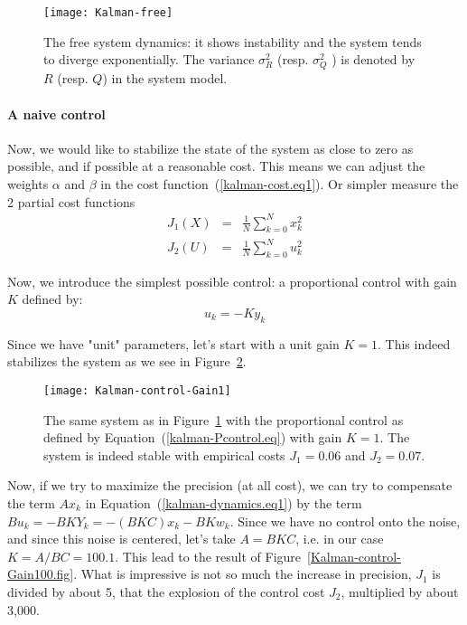 \begin{figure}[htb]
	\centering
	\texttt{[image: Kalman-free]}       
	\caption{The free system dynamics: it shows instability and the system tends to diverge exponentially. The variance $\sigma_R^2$ (resp. $\sigma_Q^2$ ) is denoted by $R$ (resp. $Q$) in the system model.}
	\label{Kalman-free.fig}
\end{figure}

\paragraph{A naive control}
Now, we would like to stabilize the state of the system as close to zero as possible, and if possible at a reasonable cost. This means we can adjust the weights $\alpha$ and $\beta$ in the cost function~(\ref{kalman-cost.eq1}). Or simpler measure the 2 partial cost functions
\begin{eqnarray}
\label{kalman-costX.eq}
J_1(X) &=& \frac{1}{N}\sum_{k=0}^N  x_k^2\\
\label{kalman-costU.eq}
J_2(U) &=& \frac{1}{N}\sum_{k=0}^N u_k^2
\end{eqnarray}

Now, we introduce the simplest possible control: a proportional control with gain $K$ defined by:
\begin{equation}
\label{kalman-Pcontrol.eq}
	u_k = -K y_k
\end{equation}

Since we have "unit" parameters, let's start with a unit gain $K=1$. This indeed stabilizes the system as we see in Figure~\ref{Kalman-control-Gain1.fig}.

\begin{figure}[htb]
	\centering
	\texttt{[image: Kalman-control-Gain1]}       
	\caption{The same system as in Figure~\ref{Kalman-free.fig} with the proportional control as defined by Equation~(\ref{kalman-Pcontrol.eq}) with gain $K=1$. The system is indeed stable with empirical costs $J_1=0.06$ and  $J_2=0.07$.}
	\label{Kalman-control-Gain1.fig}
\end{figure}

Now, if we try to maximize the precision (at all cost), we can try to compensate the term $A x_k$ in Equation~(\ref{kalman-dynamics.eq1}) by the term $B u_k = -BK Y_k = -(BKC) x_k -BK w_k$. Since we have no control onto the noise, and since this noise is centered, let's take $A = BKC$, i.e. in our case $K = A/BC = 100.1$. This lead to the result of Figure~\ref{Kalman-control-Gain100.fig}. What is impressive is not so much the increase in precision, $J_1$ is divided by about 5, that the explosion of the control cost $J_2$, multiplied by about 3,000.


